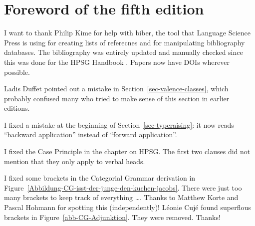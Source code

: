 
\section*{Foreword of the fifth edition}

I want to thank Philip Kime for help with biber, the tool that Language Science Press is using for
creating lists of referecnes and for manipulating bibliography databases. The bibliography was
entirely updated and manually checked since this was done for the HPSG Handbook \citep*{HPSGHandbook}. Papers
now have DOIs wherever possible.

Ladis Duffet pointed out a mistake in Section~\ref{sec-valence-classes}, which probably confused many who tried to make
sense of this section in earlier editions.











I fixed a mistake at the beginning of Section~\ref{sec-typeraising}: it now reads ``backward
application'' instead of ``forward application''.

I fixed the Case Principle in the chapter on HPSG. The first two clauses did not mention that they
only apply to verbal heads.

I fixed some brackets in the Categorial Grammar derivation in Figure~\ref{Abbildung-CG-isst-der-junge-den-kuchen-jacobs}. There were
just too many brackets to keep track of everything \ldots. Thanks to Matthew Korte and Pascal
Hohmann for spotting this (independently)!
Léonie Cujé found superflous brackets in Figure~\ref{abb-CG-Adjunktion}. They were removed. Thanks!

